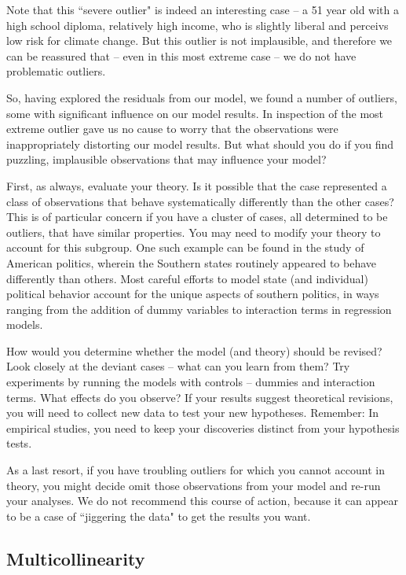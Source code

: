 \documentclass[11pt,openany]{book}\usepackage[]{graphicx}\usepackage[]{color}
\begin{document}
Note that this ``severe outlier" is indeed an interesting case -- a 51 year old with a high school diploma, relatively high income, who is slightly liberal and perceivs low risk for climate change. But this outlier is not implausible, and therefore we can be reassured that -- even in this most extreme case -- we do not have problematic outliers.

So, having explored the residuals from our model, we found a number of outliers, some with  significant influence on our model results. In inspection of the most extreme outlier gave us no cause to worry that the observations were inappropriately distorting our model results. But what should you do if you find puzzling, implausible observations that may  influence your model?

First, as always, evaluate your theory. Is it possible that the case represented a class of observations that behave systematically differently than the other cases? This is of particular concern if you have a cluster of cases, all determined to be outliers, that have similar properties. You may need to modify your theory to account for this subgroup. One such example can be found in the study of American politics, wherein the Southern states routinely appeared to behave differently than others. Most careful efforts to model state (and individual) political behavior account for the unique aspects of southern politics, in ways ranging from the addition of dummy variables to interaction terms in regression models.

How would you determine whether the model (and theory) should be revised? Look closely at the deviant cases -- what can you learn from them? Try experiments by running the models with controls -- dummies and interaction terms. What effects do you observe? If your results suggest theoretical revisions, you will need to collect new data to test your new hypotheses. Remember: In empirical studies, you need to keep your discoveries distinct from your hypothesis tests.

As a last resort, if you have troubling outliers for which you cannot account in theory, you might decide omit those observations from your model and re-run your analyses. We do not recommend this course of action, because it can  appear to be a case of ``jiggering the data" to get the results you want. 

\subsection{Multicollinearity} 
\end{document}
